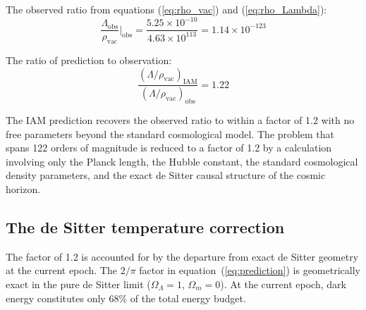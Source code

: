 \documentclass[12pt,a4paper]{article}
\begin{document}
The observed ratio from equations (\ref{eq:rho_vac}) and
(\ref{eq:rho_Lambda}):
\begin{equation}
\frac{\Lambda_\mathrm{obs}}{\rho_\mathrm{vac}}\bigg|_\mathrm{obs} =
\frac{5.25 \times 10^{-10}}{4.63 \times 10^{113}} =
1.14 \times 10^{-123}
\label{eq:observed}
\end{equation}

The ratio of prediction to observation:
\begin{equation}
\frac{(\Lambda/\rho_\mathrm{vac})_\mathrm{IAM}}
{(\Lambda/\rho_\mathrm{vac})_\mathrm{obs}} = 1.22
\label{eq:factor}
\end{equation}

The IAM prediction recovers the observed ratio to within a factor of 1.2
with no free parameters beyond the standard cosmological model. The
problem that spans 122 orders of magnitude is reduced to a factor of 1.2
by a calculation involving only the Planck length, the Hubble constant,
the standard cosmological density parameters, and the exact de Sitter
causal structure of the cosmic horizon.

\subsection{The de Sitter temperature correction}
\label{sec:dscorrection}

The factor of 1.2 is accounted for by the departure from exact de Sitter
geometry at the current epoch. The $2/\pi$ factor in
equation~(\ref{eq:prediction}) is geometrically exact in the pure de
Sitter limit ($\Omega_\Lambda = 1$, $\Omega_m = 0$). At the current
epoch, dark energy constitutes only 68\% of the total energy budget.
\end{document}

